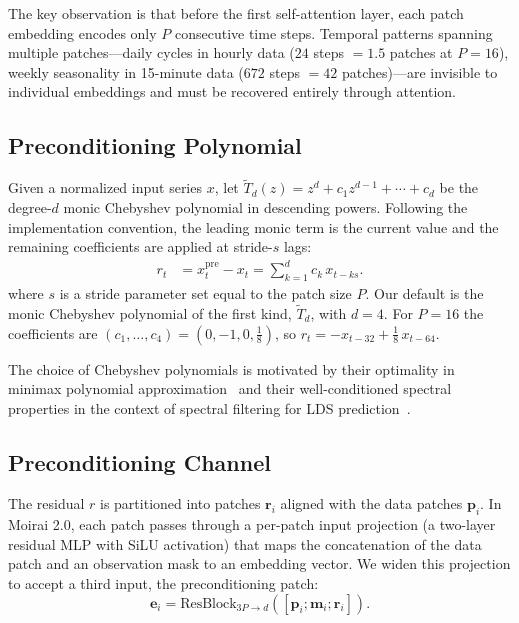 \documentclass{article}
\begin{document}
The key observation is that before the first self-attention layer, each patch embedding encodes only $P$ consecutive time steps. Temporal patterns spanning multiple patches---daily cycles in hourly data ($24$ steps $= 1.5$ patches at $P=16$), weekly seasonality in 15-minute data ($672$ steps $= 42$ patches)---are invisible to individual embeddings and must be recovered entirely through attention.

\subsection{Preconditioning Polynomial}

Given a normalized input series $x$, let $\tilde T_d(z)=z^d+c_1 z^{d-1}+\cdots+c_d$ be the degree-$d$ monic Chebyshev polynomial in descending powers. Following the implementation convention, the leading monic term is the current value and the remaining coefficients are applied at stride-$s$ lags:
\begin{equation}
\begin{aligned}
r_t &= x_t^{\mathrm{pre}} - x_t
     = \sum_{k=1}^{d} c_k\,x_{t-ks}.
\end{aligned}
\label{eq:precond}
\end{equation}
where $s$ is a stride parameter set equal to the patch size $P$. Our default is the monic Chebyshev polynomial of the first kind, $\tilde T_d$, with $d=4$. For $P=16$ the coefficients are $(c_1,\dots,c_4) = (0,-1,0,\tfrac{1}{8})$, so $r_t = -x_{t-32} + \tfrac{1}{8}\, x_{t-64}$.

The choice of Chebyshev polynomials is motivated by their optimality in minimax polynomial approximation~\citep{mason2003chebyshev} and their well-conditioned spectral properties in the context of spectral filtering for LDS prediction~\citep{hazan2017learning,marsden2024universal}.

\subsection{Preconditioning Channel}

The residual $r$ is partitioned into patches $\mathbf{r}_i$ aligned with the data patches $\mathbf{p}_i$. In Moirai 2.0, each patch passes through a per-patch input projection (a two-layer residual MLP with SiLU activation) that maps the concatenation of the data patch and an observation mask to an embedding vector. We widen this projection to accept a third input, the preconditioning patch:
\begin{equation}
\mathbf{e}_i = \text{ResBlock}_{3P \to d}([\mathbf{p}_i; \mathbf{m}_i; \mathbf{r}_i]).
\end{equation}
\end{document}
